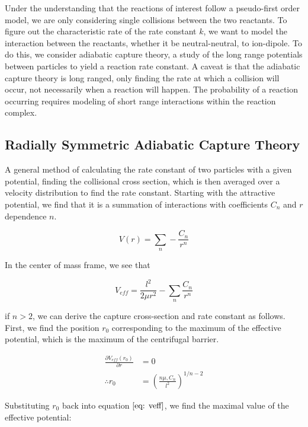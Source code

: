 Under the understanding that the reactions of interest follow a pseudo-first order model, we are only considering single collisions between the two reactants. To figure out the characteristic rate of the rate constant $k$, we want to model the interaction between the reactants, whether it be neutral-neutral, to ion-dipole. To do this, we consider adiabatic capture theory, a study of the long range potentials between particles to yield a reaction rate constant. A caveat is that the adiabatic capture theory is long ranged, only finding the rate at which a collision will occur, not necessarily when a reaction will happen. The probability of a reaction occurring requires modeling of short range interactions within the reaction complex.

\subsection{Radially Symmetric Adiabatic Capture Theory} \label{sec: ACT}
A general method of calculating the rate constant of two particles with a given potential, finding the collisional cross section, which is then averaged over a velocity distribution to find the rate constant.\cite{Zhang2017} Starting with the attractive potential, we find that it is a summation of interactions with coefficients $C_n$ and $r$ dependence $n$.

\begin{equation}
    V(r) = \sum_n -\frac{C_n}{r^n}
\end{equation}

In the center of mass frame, we see that

\begin{equation}
    V_{eff} = \frac{l^2}{2 \mu r^2} - \sum_n \frac{C_n}{r^n}\label{eq: veff}
\end{equation}

if $n > 2$, we can derive the capture cross-section and rate constant as follows. First, we find the position $r_0$ corresponding to the maximum of the effective potential, which is the maximum of the centrifugal barrier.

\begin{align*}
    \frac{\partial V_{eff}(r_0)}{\partial r} & = 0 \\
    \therefore r_0 & = \left(\frac{n \mu, C_n}{l^2}\right)^{1/n-2}
\end{align*}

Substituting $r_0$ back into equation $\ref{eq: veff}$, we find the maximal value of the effective potential:

